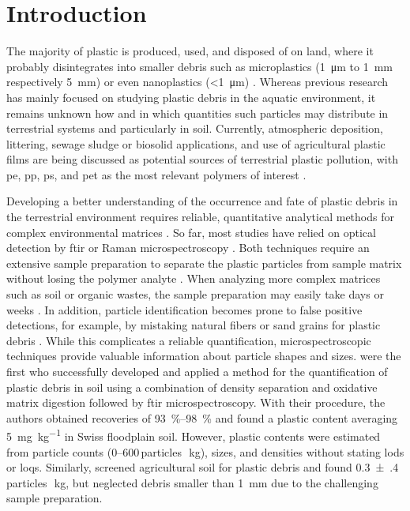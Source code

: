 \section{Introduction}

The majority of plastic is produced, used, and disposed of on land, where it probably disintegrates into smaller debris such as microplastics (\SI{1}{\micro\meter} to \SI{1}{\milli\meter} respectively \SI{5}{\milli\meter}) or even nanoplastics (\SI{<1}{\micro\meter}) \citep{HartmannAre2019,HurleyFate2018,WagnerThings2019}. Whereas previous research has mainly focused on studying plastic debris in the aquatic environment, it remains unknown how and in which quantities such particles may distribute in terrestrial systems and particularly in soil. Currently, atmospheric deposition, littering, sewage sludge or biosolid applications, and use of agricultural plastic films are being discussed as potential sources of terrestrial plastic pollution, with \ac{pe}, \ac{pp}, \ac{ps}, and \ac{pet} as the most relevant polymers of interest \citep{HurleyFate2018,WangMicroplastics2019}.

Developing a better understanding of the occurrence and fate of plastic debris in the terrestrial environment requires reliable, quantitative analytical methods for complex environmental matrices \citep{BlasingPlastics2018,HeMicroplastics2018,daCostaMicroplastics2018}. So far, most studies have relied on optical detection by \ac{ftir} or Raman microspectroscopy \citep{RennerAnalytical2018}. Both techniques require an extensive sample preparation to separate the plastic particles from sample matrix without losing the polymer analyte \citep{HurleyValidation2018}. When analyzing more complex matrices such as soil or organic wastes, the sample preparation may easily take days or weeks \citep{LoderEnzymatic2017}. In addition, particle identification becomes prone to false positive detections, for example, by mistaking natural fibers or sand grains for plastic debris \citep{BlasingPlastics2018}. While this complicates a reliable quantification, microspectroscopic techniques provide valuable information about particle shapes and sizes. \citet{ScheurerMicroplastics2018} were the first who successfully developed and applied a method for the quantification of plastic debris in soil using a combination of density separation and oxidative matrix digestion followed by \ac{ftir} microspectroscopy. With their procedure, the authors obtained recoveries of \SIrange{93}{98}{\percent} and found a plastic content averaging \SI{5}{\milli\gram\per\kilo\gram} in Swiss floodplain soil. However, plastic contents were estimated from particle counts (\numrange{0}{600}\,particles\,\si{\per\kilo\gram}), sizes, and densities without stating \acp{lod} or \acp{loq}. Similarly, \citet{PiehlIdentification2018} screened agricultural soil for plastic debris and found \num{0.3(4)}\,particles\,\si{\per\kilo\gram}, but neglected debris smaller than \SI{1}{\milli\meter} due to the challenging sample preparation.

